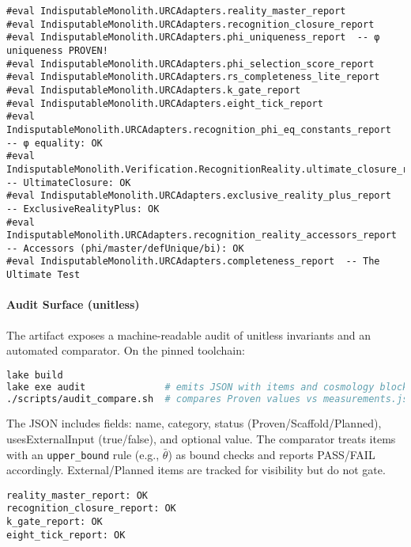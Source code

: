 \documentclass[11pt,a4paper,twoside]{article}
\numberwithin{equation}{section}
\theoremstyle{customthm}
\theoremstyle{customdef}
\theoremstyle{customrem}
\begin{document}
\hypertarget{verify-minimal}{}
\begin{importantbox}
\begin{lstlisting}
#eval IndisputableMonolith.URCAdapters.reality_master_report
#eval IndisputableMonolith.URCAdapters.recognition_closure_report
#eval IndisputableMonolith.URCAdapters.phi_uniqueness_report  -- φ uniqueness PROVEN!
#eval IndisputableMonolith.URCAdapters.phi_selection_score_report
#eval IndisputableMonolith.URCAdapters.rs_completeness_lite_report
#eval IndisputableMonolith.URCAdapters.k_gate_report
#eval IndisputableMonolith.URCAdapters.eight_tick_report
#eval IndisputableMonolith.URCAdapters.recognition_phi_eq_constants_report  -- φ equality: OK
#eval IndisputableMonolith.Verification.RecognitionReality.ultimate_closure_report -- UltimateClosure: OK
#eval IndisputableMonolith.URCAdapters.exclusive_reality_plus_report        -- ExclusiveRealityPlus: OK
#eval IndisputableMonolith.URCAdapters.recognition_reality_accessors_report -- Accessors (phi/master/defUnique/bi): OK
#eval IndisputableMonolith.URCAdapters.completeness_report  -- The Ultimate Test
\end{lstlisting}
\end{importantbox}

\paragraph{Audit Surface (unitless)} The artifact exposes a machine-readable audit of unitless invariants and an automated comparator. On the pinned toolchain:
\begin{lstlisting}[language=bash]
lake build
lake exe audit              # emits JSON with items and cosmology blocks
./scripts/audit_compare.sh  # compares Proven values vs measurements.json
\end{lstlisting}
The JSON includes fields: name, category, status (Proven/Scaffold/Planned), usesExternalInput (true/false), and optional value. The comparator treats items with an \texttt{upper\_bound} rule (e.g., $\bar{\theta}$) as bound checks and reports PASS/FAIL accordingly. External/Planned items are tracked for visibility but do not gate.

\begin{resultbox}
\small
\begin{verbatim}
reality_master_report: OK
recognition_closure_report: OK
k_gate_report: OK
eight_tick_report: OK
\end{verbatim}
\end{resultbox}
\end{document}
